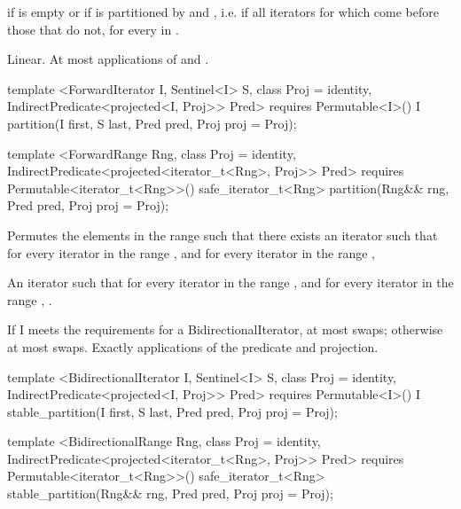 \begin{itemdescr}
\pnum
\returns {} if
 is empty or if
 is partitioned by  and , i.e. if all
iterators  for which
 come before those that do not,
for every  in .

\pnum
\complexity Linear. At most  applications of  and .
\end{itemdescr}

%
\begin{itemdecl}
template <ForwardIterator I, Sentinel<I> S, class Proj = identity,
    IndirectPredicate<projected<I, Proj>> Pred>
  requires Permutable<I>()
  I partition(I first, S last, Pred pred, Proj proj = Proj{});

template <ForwardRange Rng, class Proj = identity,
    IndirectPredicate<projected<iterator_t<Rng>, Proj>> Pred>
  requires Permutable<iterator_t<Rng>>()
  safe_iterator_t<Rng>
    partition(Rng&& rng, Pred pred, Proj proj = Proj{});
\end{itemdecl}

\begin{itemdescr}
\pnum
\effects Permutes the elements in the range  such that there exists an iterator 
such that for every iterator  in the range 
, and for every iterator  in the
range , 

\pnum
\returns An iterator  such that for every iterator  in the range 
,
and for every iterator  in the range ,
.

\pnum
\complexity If I meets the requirements for a BidirectionalIterator, at most
 swaps; otherwise at most  swaps.
Exactly  applications of the predicate and projection.
\end{itemdescr}

%
\begin{itemdecl}
template <BidirectionalIterator I, Sentinel<I> S, class Proj = identity,
    IndirectPredicate<projected<I, Proj>> Pred>
  requires Permutable<I>()
  I stable_partition(I first, S last, Pred pred, Proj proj = Proj{});

template <BidirectionalRange Rng, class Proj = identity,
    IndirectPredicate<projected<iterator_t<Rng>, Proj>> Pred>
  requires Permutable<iterator_t<Rng>>()
  safe_iterator_t<Rng>
    stable_partition(Rng&& rng, Pred pred, Proj proj = Proj{});
\end{itemdecl}


